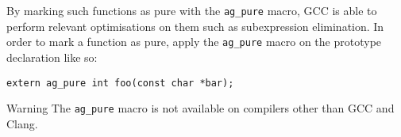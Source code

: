 By marking such functions as pure with the \texttt{ag\_pure} macro, GCC is able
to perform relevant optimisations on them such as subexpression elimination. In
order to mark a function as pure, apply the \texttt{ag\_pure} macro on the
prototype declaration like so:
\begin{lstlisting}[linewidth=1.0\linewidth]
extern ag_pure int foo(const char *bar);
\end{lstlisting}

\begin{bclogo}[logo=\bctakecare, noborder=true, couleurBarre=orange]{Warning}
  The \verb|ag_pure| macro is not available on compilers other than GCC and
  Clang.
\end{bclogo}

